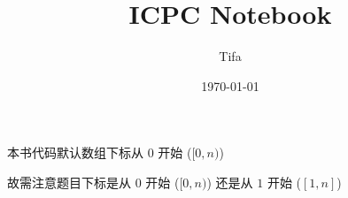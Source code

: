\documentclass{ICPCnotebook}
\title{\vspace{-4ex}\Large{ICPC Notebook}}
\author{Tifa}
\date{\today}
\begin{document}
    \maketitle

    \pagestyle{plain}

	\setcounter{page}{1}

    \begin{multicols}{2}
        \tableofcontents
    \end{multicols}

    \newpage
    本书代码默认数组下标从 \(0\) 开始 (\([0, n)\))

    故需注意题目下标是从 \(0\) 开始 (\([0, n)\)) 还是从 \(1\) 开始 (\([1, n]\))

    \newpage
	\pagestyle{fancy}
	\setcounter{page}{1}

    \begin{multicols}{2}
        
        
    \end{multicols}

    
    
\end{document}
